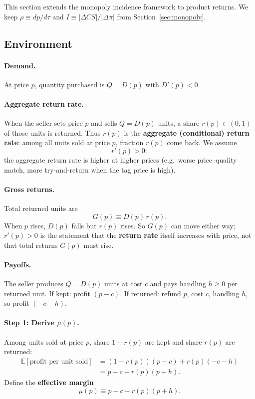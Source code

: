 \documentclass[11pt]{article}
\begin{document}
This section extends the monopoly incidence framework to product returns.
We keep $\rho \equiv dp/d\tau$ and $I \equiv |\Delta CS|/|\Delta\pi|$ from
Section~\ref{sec:monopoly}.

\subsection{Environment}

\paragraph{Demand.}
At price $p$, quantity purchased is $Q = D(p)$ with $D'(p) < 0$.

\paragraph{Aggregate return rate.}
When the seller sets price $p$ and sells $Q = D(p)$ units, a share
$r(p) \in (0,1)$ of those units is returned.  Thus $r(p)$ is the
\textbf{aggregate (conditional) return rate}: among all units sold at
price $p$, fraction $r(p)$ come back.  We assume
\begin{equation}
  r'(p) > 0:
  \label{eq:r-increasing}
\end{equation}
the aggregate return rate is higher at higher prices (e.g.\ worse
price--quality match, more try-and-return when the tag price is high).

\paragraph{Gross returns.}
Total returned units are
\[
  G(p) \equiv D(p)\,r(p).
\]
When $p$ rises, $D(p)$ falls but $r(p)$ rises.  So $G(p)$ can move either
way; $r'(p)>0$ is the statement that the \textbf{return rate} itself
increases with price, not that total returns $G(p)$ must rise.

\paragraph{Payoffs.}
The seller produces $Q = D(p)$ units at cost $c$ and pays handling $h \ge 0$
per returned unit.  If kept: profit $(p-c)$.  If returned: refund $p$, cost
$c$, handling $h$, so profit $(-c-h)$.

\paragraph{Step 1: Derive $\mu(p)$.}
Among units sold at price $p$, share $1-r(p)$ are kept and share $r(p)$
are returned:
\begin{align*}
  \mathbb{E}[\text{profit per unit sold}]
  &= (1-r(p))(p-c) + r(p)(-c-h) \\
  &= p - c - r(p)(p+h).
\end{align*}
Define the \textbf{effective margin}
\begin{equation}
  \mu(p) \equiv p - c - r(p)(p+h).
  \label{eq:margin}
\end{equation}
\end{document}
